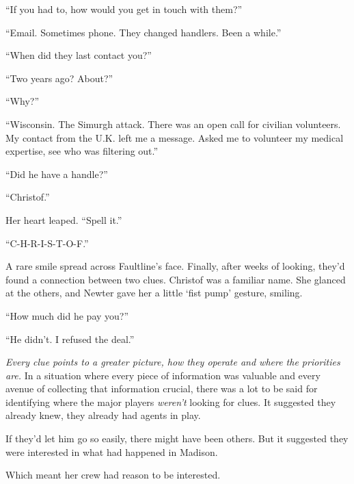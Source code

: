 ``If you had to, how would you get in touch with them?''



``Email.  Sometimes phone.  They changed handlers.  Been a while.''



``When did they last contact you?''



``Two years ago?  About?''



``Why?''



``Wisconsin.  The Simurgh attack.  There was an open call for civilian volunteers.  My contact from the U.K. left me a message.  Asked me to volunteer my medical expertise, see who was filtering out.''



``Did he have a handle?''



``Christof.''



Her heart leaped.  ``Spell it.''



``C-H-R-I-S-T-O-F.''



A rare smile spread across Faultline's face.  Finally, after weeks of looking, they'd found a connection between two clues.  Christof was a familiar name.  She glanced at the others, and Newter gave her a little `fist pump' gesture, smiling.



``How much did he pay you?''



``He didn't.  I refused the deal.''



\emph{Every clue points to a greater picture, how they operate and where the priorities are.}  In a situation where every piece of information was valuable and every avenue of collecting that information crucial, there was a lot to be said for identifying where the major players \emph{weren't} looking for clues.  It suggested they already knew, they already had agents in play.



If they'd let him go so easily, there might have been others.  But it suggested they were interested in what had happened in Madison.



Which meant her crew had reason to be interested.




